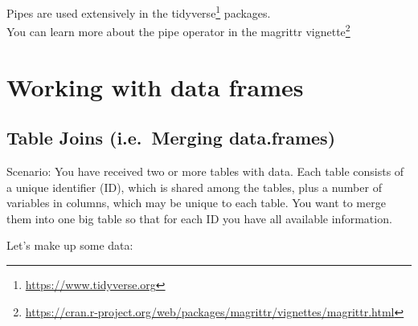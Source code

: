 \documentclass[
]{book}
\DeclareRobustCommand{\href}[2]{#2\footnote{\url{#1}}}
\renewcommand{\href}[2]{#2\footnote{\url{#1}}}
\begin{document}
Pipes are used extensively in the \href{https://www.tidyverse.org}{tidyverse} packages.\\
You can learn more about the pipe operator in the \href{https://cran.r-project.org/web/packages/magrittr/vignettes/magrittr.html}{magrittr vignette}

\hypertarget{dataframes}{%
\chapter{Working with data frames}\label{dataframes}}

\hypertarget{table-joins-i.e.-merging-data.frames}{%
\section{Table Joins (i.e.~Merging data.frames)}\label{table-joins-i.e.-merging-data.frames}}

Scenario: You have received two or more tables with data. Each table consists of a unique identifier (ID), which is shared among the tables, plus a number of variables in columns, which may be unique to each table. You want to merge them into one big table so that for each ID you have all available information.

Let's make up some data:
\end{document}
